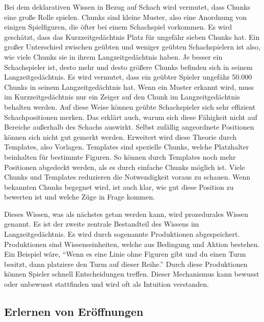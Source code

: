 Bei dem deklarativen Wissen in Bezug auf Schach wird vermutet, dass Chunks eine große Rolle spielen. Chunks sind kleine Muster, also eine Anordnung von einigen Spielfiguren, die öfter bei einem Schachspiel vorkommen. Es wird geschätzt, dass das Kurzzeitgedächtnis Platz für ungefähr sieben Chunks hat. Ein großer Unterschied zwischen geübten und weniger geübten Schachspielern ist also, wie viele Chunks sie in ihrem Langzeitgedächtnis haben. Je besser ein Schachspieler ist, desto mehr und desto größere Chunks befinden sich in seinem Langzeitgedächtnis. Es wird vermutet, dass ein geübter Spieler ungefähr 50.000 Chunks in seinem Langzeitgedächtnis hat. Wenn ein Muster erkannt wird, muss im Kurzzeitgedächtnis nur ein Zeiger auf den Chunk im Langzeitgedächtnis behalten werden. Auf diese Weise können geübte Schachspieler sich sehr effizient Schachpositionen merken. Das erklärt auch, warum sich diese Fähigkeit nicht auf Bereiche außerhalb des Schachs auswirkt. Selbst zufällig angeordnete Positionen können sich nicht gut gemerkt werden. Erweitert wird diese Theorie durch Templates, also Vorlagen. Templates sind spezielle Chunks, welche Platzhalter beinhalten für bestimmte Figuren. So können durch Templates noch mehr Positionen abgedeckt werden, als es durch einfache Chunks möglich ist. Viele Chunks und Templates reduzieren die Notwendigkeit voraus zu schauen. Wenn bekannten Chunks begegnet wird, ist auch klar, wie gut diese Position zu bewerten ist und welche Züge in Frage kommen.\cite{gobet_templates_1996}

Dieses Wissen, was als nächstes getan werden kann, wird prozedurales Wissen genannt. Es ist der zweite zentrale Bestandteil des Wissens im Langzeitgedächtnis. Es wird durch sogenannte Produktionen abgespeichert. Produktionen sind Wissenseinheiten, welche aus Bedingung und Aktion bestehen. Ein Beispiel wäre, \enquote{Wenn es eine Linie ohne Figuren gibt und du einen Turm besitzt, dann platziere den Turm auf dieser Reihe.} Durch diese Produktionen können Spieler schnell Entscheidungen treffen. Dieser Mechanismus kann bewusst oder unbewusst stattfinden und wird oft als Intuition verstanden.\cite{gobet_training_2006}

\subsection{Erlernen von Eröffnungen}

